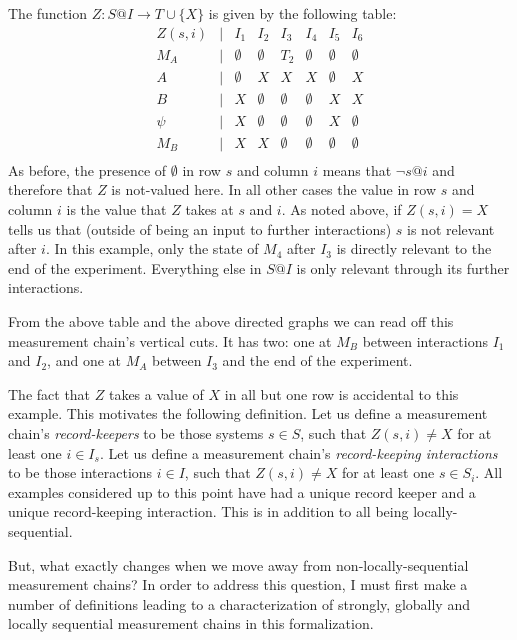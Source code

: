 \documentclass[prd,twocolumn,superscriptaddress,floatfix,amsmath,amssymb,amsfonts,nofootinbib]{revtex4-2}
\begin{document}
The function $Z:S@I\to T\cup\{X\}$ is given by the following table:
\[\begin{array}{cccccccc}
Z(s,i) & \vert & I_1 & I_2 & I_3 & I_4 & I_5 & I_6\\
M_A & \vert & \emptyset & \emptyset & T_2 & \emptyset & \emptyset & \emptyset\\
A & \vert & \emptyset & X & X & X & \emptyset & X\\
B & \vert & X & \emptyset & \emptyset & \emptyset & X & X\\
\psi & \vert & X & \emptyset & \emptyset & \emptyset & X & \emptyset\\
M_B & \vert & X & X & \emptyset & \emptyset & \emptyset & \emptyset\\
\end{array}\]
As before, the presence of $\emptyset$ in row $s$ and column $i$ means that $\neg s@i$ and therefore that $Z$ is not-valued here. In all other cases the value in row $s$ and column $i$ is the value that $Z$ takes at $s$ and $i$. As noted above, if $Z(s,i)=X$ tells us that (outside of being an input to further interactions) $s$ is not relevant after $i$. In this example, only the state of $M_4$ after $I_3$ is directly relevant to the end of the experiment. Everything else in $S@I$ is only relevant through its further interactions.

From the above table and the above directed graphs we can read off this measurement chain's vertical cuts. It has two: one at $M_B$ between interactions $I_1$ and $I_2$, and one at $M_A$ between $I_3$ and the end of the experiment.

The fact that $Z$ takes a value of $X$ in all but one row is accidental to this example. This motivates the following definition. Let us define a measurement chain's \textit{record-keepers} to be those systems $s\in S$, such that $Z(s,i)\neq X$ for at least one $i\in I_s$. Let us define a measurement chain's \textit{record-keeping interactions} to be those interactions $i\in I$, such that $Z(s,i)\neq X$ for at least one $s\in S_i$. All examples considered up to this point have had a unique record keeper and a unique record-keeping interaction. This is in addition to all being locally-sequential.

But, what exactly changes when we move away from non-locally-sequential measurement chains? In order to address this question, I must first make a number of definitions leading to a characterization of strongly, globally and locally sequential measurement chains in this formalization. 
\end{document}
